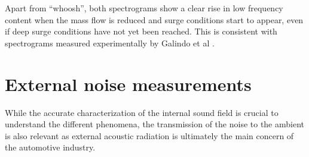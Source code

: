Apart from ``whoosh'', both spectrograms show a clear rise in low frequency content when the mass flow is reduced and surge conditions start to appear, even if deep surge conditions have not yet been reached. This is consistent with spectrograms measured experimentally by Galindo et al \cite{galindo2009effect}.





\section{External noise measurements}
\label{sec:method_external}

While the accurate characterization of the internal sound field is crucial to understand the different phenomena, the transmission of the noise to the ambient is also relevant as external acoustic radiation is ultimately the main concern of the automotive industry.

